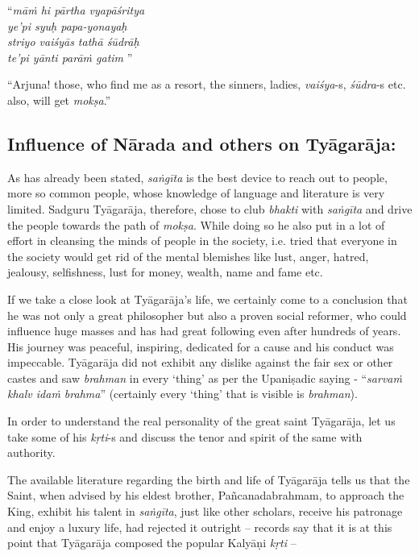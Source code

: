 \begin{centerquote}
“\textit{māṁ hi pārtha vyapāśritya}\\ \textit{ye’pi syuḥ papa-yonayaḥ }\\ \textit{striyo vaiśyās tathā śūdrāḥ} \\ \textit{te’pi yānti parāṁ gatim }”
\end{centerquote}

``Arjuna! those, who find me as a resort, the sinners, ladies, \textit{vaiśya}-s, \textit{śūdra}-s etc. also, will get \textit{mokṣa}.''


\subsection*{Influence of Nārada and others on Tyāgarāja:}

As has already been stated, \textit{saṅgīta} is the best device to reach out to people, more so common people, whose knowledge of language and literature is very limited. Sadguru Tyāgarāja, therefore, chose to club \textit{bhakti} with \textit{saṅgīta} and drive the people towards the path of \textit{mokṣa}. While doing so he also put in a lot of effort in cleansing the minds of people in the society, i.e. tried that everyone in the society would get rid of the mental blemishes like lust, anger, hatred, jealousy, selfishness, lust for money, wealth, name and fame etc. 

If we take a close look at Tyāgarāja’s life, we certainly come to a conclusion that he was not only a great philosopher but also a proven social reformer, who could influence huge masses and has had great following even after hundreds of years. His journey was peaceful, inspiring, dedicated for a cause and his conduct was impeccable. Tyāgarāja did not exhibit any dislike against the fair sex or other castes and saw \textit{brahman} in every ‘thing’ as per the Upaniṣadic saying - “\textit{sarvaṁ khalv idaṁ brahma}” (certainly every ‘thing’ that is visible is \textit{brahman}).

In order to understand the real personality of the great saint Tyāgarāja, let us take some of his \textit{kṛti}-s and discuss the tenor and spirit of the same with authority.

The available literature regarding the birth and life of Tyāgarāja tells us that the Saint, when advised by his eldest brother, Pañcanadabrahmam, to approach the King, exhibit his talent in \textit{saṅgīta}, just like other scholars, receive his patronage and enjoy a luxury life, had rejected it outright – records say that it is at this point that Tyāgarāja composed the popular Kalyāṇi \textit{kṛti} –

